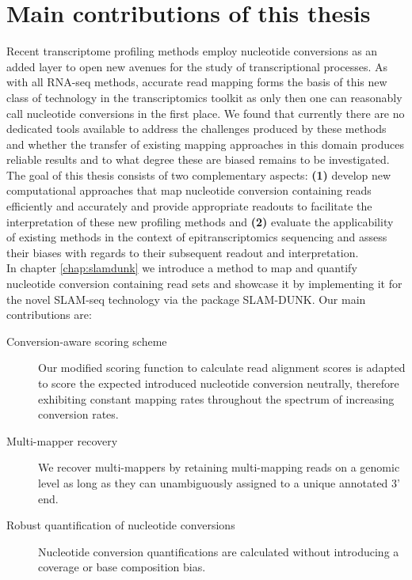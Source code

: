 \chapter{Main contributions of this thesis}

Recent transcriptome profiling methods employ nucleotide conversions as an added layer to open new avenues for the study of transcriptional processes. As with all RNA-seq methods, accurate read mapping forms the basis of this new class of technology in the transcriptomics toolkit as only then one can reasonably call nucleotide conversions in the first place. We found that currently there are no dedicated tools available to address the challenges produced by these methods and whether the transfer of existing mapping approaches in this domain produces reliable results and to what degree these are biased remains to be investigated.
The goal of this thesis consists of two complementary aspects: \textbf{(1)} develop new computational approaches that map nucleotide conversion containing reads efficiently and accurately and provide appropriate readouts to facilitate the interpretation of these new profiling methods and \textbf{(2)} evaluate the applicability of existing methods in the context of epitranscriptomics sequencing and assess their biases with regards to their subsequent readout and interpretation. \\
In chapter \ref{chap:slamdunk} we introduce a method to map and quantify nucleotide conversion containing read sets and showcase it by implementing it for the novel SLAM-seq technology via the package SLAM-DUNK. Our main contributions are:
\begin{description}
    \item [Conversion-aware scoring scheme] Our modified scoring function to calculate read alignment scores is adapted to score the expected introduced nucleotide conversion neutrally, therefore exhibiting constant mapping rates throughout the spectrum of increasing conversion rates.
    \item[Multi-mapper recovery] We recover multi-mappers by retaining multi-mapping reads on a genomic level as long as they can unambiguously assigned to a unique annotated 3' end.
    \item[Robust quantification of nucleotide conversions] Nucleotide conversion quantifications are calculated without introducing a coverage or base composition bias.
\end{description}

